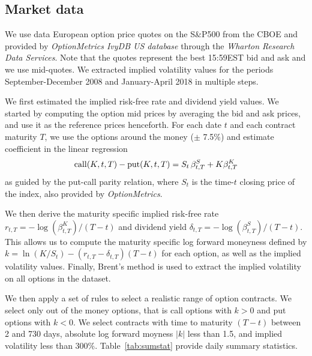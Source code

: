 \subsection{Market data} \label{sec:datamkt}
We use data European option price quotes on the S\&P500 from the CBOE and provided by \emph{OptionMetrics IvyDB US database} through the \emph{Wharton Research Data Services}. Note that the quotes represent the best 15:59EST bid and ask and we use mid-quotes.
We extracted implied volatility values for the periods September-December 2008 and January-April 2018 in multiple steps.

We first estimated the implied risk-free rate and dividend yield values. 
We started by computing the option mid prices by averaging the bid and ask prices, and use it as the reference prices henceforth. 
For each date $t$ and each contract maturity $T$, we use the options around the money ($\pm$ 7.5\%) and estimate coefficient in the linear regression 
$${\rm call}(K,t,T) - {\rm put}(K,t,T) = S_t\,\beta^S_{t,T} + K\beta^K_{t,T}$$
as guided by the put-call parity relation, where $S_t$ is the time-$t$ closing price of the index, also provided by \emph{OptionMetrics}.

We then derive the maturity specific implied risk-free rate $r_{t,T}=-\log(\beta^K_{t,T})/(T-t)$ and dividend yield $\delta_{t,T}=-\log(\beta^S_{t,T})/(T-t)$. 
This allows us to compute the maturity specific log forward moneyness defined by $k = \ln(K/S_t) - (r_{t,T}-\delta_{t,T})(T-t)$ for each option, as well as the implied volatility values. Finally, Brent's method is used to extract the implied volatility on all options in the dataset.

We then apply a set of rules to select a realistic range of option contracts. 
We select only out of the money options, that is call options with $k>0$ and put options with $k<0$. 
We select contracts with time to maturity $(T-t)$ between 2 and 730 days, absolute log forward moyness \(|k|\) less than 1.5, and implied volatility less than 300\%.
Table~\ref{tab:sumstat} provide daily summary statistics.

